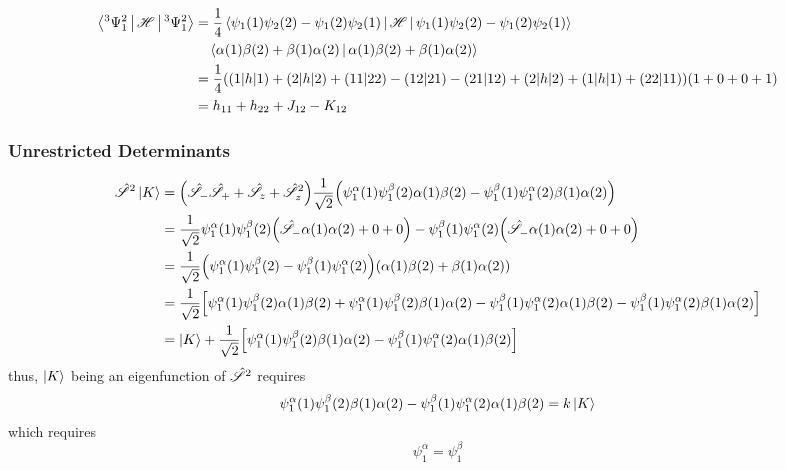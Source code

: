 \documentclass[a4paper]{article}
\begin{document}
\subex{$ \bullet $}
\begin{align}
\Braket{^3\Psi_1^2 | \operatorname{\mathscr{H}} | ^3\Psi_1^2} &= \dfrac{1}{4} \Braket{\psi_1(1)\psi_2(2) - \psi_1(2)\psi_2(1) | \operatorname{\mathscr{H}} | \psi_1(1)\psi_2(2) - \psi_1(2)\psi_2(1)} \notag\\
&\quad{} \Braket{\alpha(1)\beta(2) + \beta(1)\alpha(2) | \alpha(1)\beta(2) + \beta(1)\alpha(2)}\notag\\
&= \dfrac{1}{4}((1|h|1) + (2|h|2) + (11|22) - (12|21) - (21|12) + (2|h|2) + (1|h|1) + (22|11) ) (1 + 0 + 0 + 1) \notag\\
&= h_{11} + h_{22} + J_{12} - K_{12}
\end{align}

\subsubsection{Unrestricted Determinants}
\begin{align}
\hsS^2\ket{K} &= \qty(\hsS_-\hsS_+ + \hsS_z + \hsS_z^2) \dfrac{1}{\sqrt{2}} \qty(\psi_1^\alpha(1)\psi_1^\beta(2)\alpha(1)\beta(2) - \psi_1^\beta(1)\psi_1^\alpha(2)\beta(1)\alpha(2))\notag \\
&= \dfrac{1}{\sqrt{2}} \psi_1^\alpha(1)\psi_1^\beta(2) \qty(\hsS_-\alpha(1)\alpha(2) + 0 + 0) - \psi_1^\beta(1)\psi_1^\alpha(2) \qty(\hsS_-\alpha(1)\alpha(2) + 0 + 0) \notag\\
&= \dfrac{1}{\sqrt{2}} \qty(\psi_1^\alpha(1)\psi_1^\beta(2) - \psi_1^\beta(1)\psi_1^\alpha(2)) \qty(\alpha(1)\beta(2) + \beta(1)\alpha(2)) \notag\\
&= \dfrac{1}{\sqrt{2}} \qty[\psi_1^\alpha(1)\psi_1^\beta(2)\alpha(1)\beta(2) 
+ \psi_1^\alpha(1)\psi_1^\beta(2)\beta(1)\alpha(2) %
- \psi_1^\beta(1)\psi_1^\alpha(2)\alpha(1)\beta(2) 
- \psi_1^\beta(1)\psi_1^\alpha(2)\beta(1)\alpha(2)] \notag\\
&= \ket{K} + \dfrac{1}{\sqrt{2}} \qty[\psi_1^\alpha(1)\psi_1^\beta(2)\beta(1)\alpha(2) 
- \psi_1^\beta(1)\psi_1^\alpha(2)\alpha(1)\beta(2)]
\end{align}
thus, $ \ket{K} $ being an eigenfunction of $ \hat{\mathscr{S}}^2 $ requires
\begin{align}
\psi_1^\alpha(1)\psi_1^\beta(2)\beta(1)\alpha(2) 
- \psi_1^\beta(1)\psi_1^\alpha(2)\alpha(1)\beta(2) = k\ket{K}
\end{align}
which requires
\begin{equation}\label{key}
\psi_1^\alpha = \psi_1^\beta
\end{equation}
\end{document}
